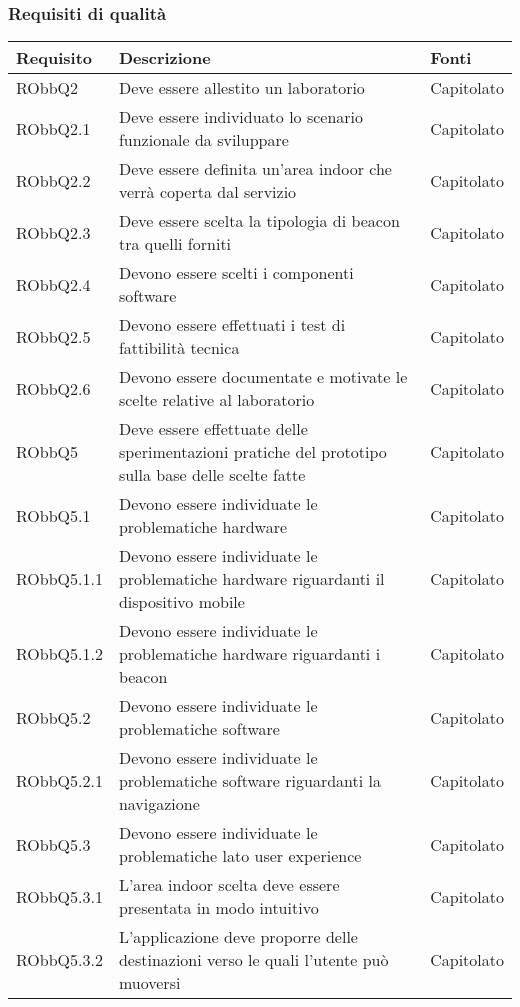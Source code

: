 \documentclass[../AnalisiDeiRequisiti.tex]{subfiles}
\begin{document}
\subsubsection{Requisiti di qualità}
\begin{longtabu} to \textwidth {X X[2] X}
\toprule
\textbf{Requisito} & \textbf{Descrizione} & \textbf{Fonti}\\
\midrule
\endhead
{}
RObbQ2 & Deve essere allestito un laboratorio & Capitolato \\ 
\midrule 
RObbQ2.1 & Deve essere individuato lo scenario funzionale da sviluppare & Capitolato \\ 
\midrule 
RObbQ2.2 & Deve essere definita un'area indoor che verrà coperta dal servizio & Capitolato \\ 
\midrule 
RObbQ2.3 & Deve essere scelta la tipologia di beacon tra quelli forniti & Capitolato \\ 
\midrule 
RObbQ2.4 & Devono essere scelti i componenti software & Capitolato \\ 
\midrule 
RObbQ2.5 & Devono essere effettuati i test di fattibilità tecnica & Capitolato \\ 
\midrule 
RObbQ2.6 & Devono essere documentate e motivate le scelte relative al laboratorio & Capitolato \\ 
\midrule 
RObbQ5 & Deve essere effettuate delle sperimentazioni pratiche del prototipo sulla base delle scelte fatte & Capitolato \\ 
\midrule 
RObbQ5.1 & Devono essere individuate le problematiche hardware & Capitolato \\ 
\midrule 
RObbQ5.1.1 & Devono essere individuate le problematiche hardware riguardanti il dispositivo mobile & Capitolato \\ 
\midrule 
RObbQ5.1.2 & Devono essere individuate le problematiche hardware riguardanti i beacon & Capitolato \\ 
\midrule 
RObbQ5.2 & Devono essere individuate le problematiche software & Capitolato \\ 
\midrule 
RObbQ5.2.1 & Devono essere individuate le problematiche software riguardanti la navigazione & Capitolato \\ 
\midrule 
RObbQ5.3 & Devono essere individuate le problematiche lato user experience & Capitolato \\ 
\midrule 
RObbQ5.3.1 & L'area indoor scelta deve essere presentata in modo intuitivo  & Capitolato \\ 
\midrule 
RObbQ5.3.2 & L'applicazione deve proporre delle destinazioni verso le quali l'utente può muoversi & Capitolato \\ 

\end{longtabu}
\end{document}
